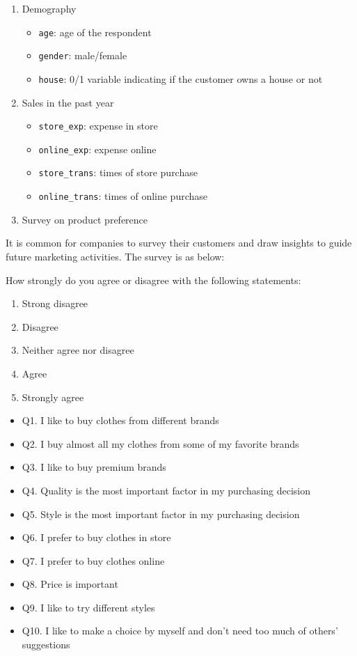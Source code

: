 \documentclass[12pt,]{krantz}
\providecommand{\tightlist}{%
  \setlength{\itemsep}{0pt}\setlength{\parskip}{0pt}}
\theoremstyle{definition}
\theoremstyle{definition}
\theoremstyle{remark}
\begin{document}
\begin{enumerate}
\def\labelenumi{\arabic{enumi}.}
\tightlist
\item
  Demography

  \begin{itemize}
  \tightlist
  \item
    \texttt{age}: age of the respondent
  \item
    \texttt{gender}: male/female
  \item
    \texttt{house}: 0/1 variable indicating if the customer owns a house
    or not
  \end{itemize}
\item
  Sales in the past year

  \begin{itemize}
  \tightlist
  \item
    \texttt{store\_exp}: expense in store
  \item
    \texttt{online\_exp}: expense online
  \item
    \texttt{store\_trans}: times of store purchase
  \item
    \texttt{online\_trans}: times of online purchase
  \end{itemize}
\item
  Survey on product preference
\end{enumerate}

It is common for companies to survey their customers and draw insights
to guide future marketing activities. The survey is as below:

How strongly do you agree or disagree with the following statements:

\begin{enumerate}
\def\labelenumi{\arabic{enumi}.}
\tightlist
\item
  Strong disagree
\item
  Disagree
\item
  Neither agree nor disagree
\item
  Agree
\item
  Strongly agree
\end{enumerate}

\begin{itemize}
\tightlist
\item
  Q1. I like to buy clothes from different brands
\item
  Q2. I buy almost all my clothes from some of my favorite brands
\item
  Q3. I like to buy premium brands
\item
  Q4. Quality is the most important factor in my purchasing decision
\item
  Q5. Style is the most important factor in my purchasing decision
\item
  Q6. I prefer to buy clothes in store
\item
  Q7. I prefer to buy clothes online
\item
  Q8. Price is important
\item
  Q9. I like to try different styles
\item
  Q10. I like to make a choice by myself and don't need too much of
  others' suggestions
\end{itemize}
\end{document}
